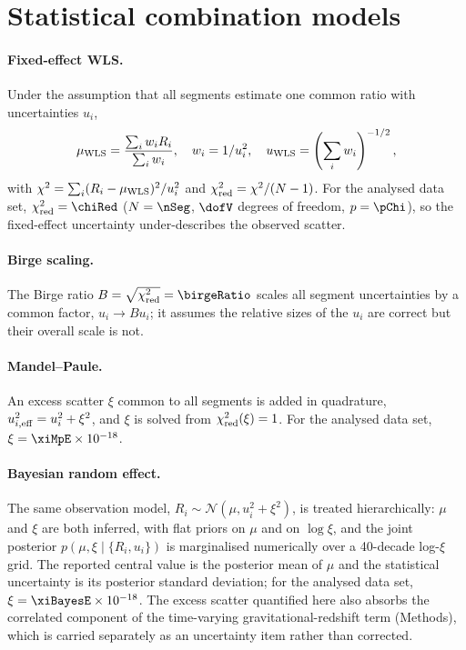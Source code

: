 \begin{table}[t]
  \centering
  \caption{Per-segment data of the 16 segments analysed in this work. Ratio
  deviations $y_i = R_i/R_1 - 1$ are relative to the first segment;
  $u(y_i)$ is the statistical uncertainty of the segment ratio;
  ``Fit'' is \emph{est.} for segments whose stability fit lies in the
  white-frequency-noise band and \emph{lim.} for model-limited fits.}
  \label{tab:segments}
  
\end{table}

\section{Statistical combination models}
\label{app:stats}

\paragraph{Fixed-effect WLS.} Under the assumption that all segments
estimate one common ratio with uncertainties $u_i$,
\[
  \mu_{\rm WLS} = \frac{\sum_i w_i R_i}{\sum_i w_i}, \quad
  w_i = 1/u_i^2, \quad
  u_{\rm WLS} = \left(\sum_i w_i\right)^{-1/2},
\]
with $\chi^2 = \sum_i (R_i - \mu_{\rm WLS})^2 / u_i^2$ and
$\chi^2_{\rm red} = \chi^2/(N-1)$. For the analysed data set,
$\chi^2_{\rm red} = \chiRed$ ($N = \nSeg$,
$\dofV$ degrees of freedom, $p = \pChi$), so the fixed-effect
uncertainty under-describes the observed scatter.

\paragraph{Birge scaling.} The Birge ratio
$B = \sqrt{\chi^2_{\rm red}} = \birgeRatio$ scales all segment
uncertainties by a common factor, $u_i \to B u_i$; it assumes the
relative sizes of the $u_i$ are correct but their overall scale is
not.

\paragraph{Mandel--Paule.} An excess scatter $\xi$ common to all
segments is added in quadrature, $u_{i,\rm eff}^2 = u_i^2 + \xi^2$,
and $\xi$ is solved from $\chi^2_{\rm red}(\xi) = 1$. For the analysed
data set, $\xi = \xiMpE \times 10^{-18}$.

\paragraph{Bayesian random effect.} The same observation model,
$R_i \sim \mathcal{N}(\mu, u_i^2 + \xi^2)$, is treated
hierarchically: $\mu$ and $\xi$ are both inferred, with flat priors
on $\mu$ and on $\log\xi$, and the joint posterior
$p(\mu, \xi \mid \{R_i, u_i\})$ is marginalised numerically over a
40-decade log-$\xi$ grid. The reported central value is the posterior
mean of $\mu$ and the statistical uncertainty is its posterior
standard deviation; for the analysed data set,
$\xi = \xiBayesE \times 10^{-18}$. The excess scatter quantified here
also absorbs the correlated component of the time-varying
gravitational-redshift term (Methods), which
is carried separately as an uncertainty item rather than corrected.

